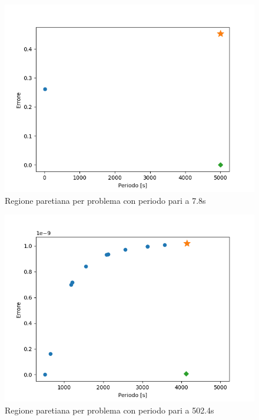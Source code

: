 \documentclass[a4paper,12pt]{report}
\begin{document}
\begin{figure}[H]
  \centering
  \includegraphics[scale=0.70]{img/puls08/utopia/principale.png}
  \caption{Regione paretiana per problema con periodo pari a 7.8s}
  \label{fig:08t}
\end{figure}

\begin{figure}[H]
  \centering
  \includegraphics[scale=0.70]{img/puls0125/utopia/sol_corretta.png}
  \caption{Regione paretiana per problema con periodo pari a 502.4s}
  \label{fig:0125t}
\end{figure}
\end{document}
